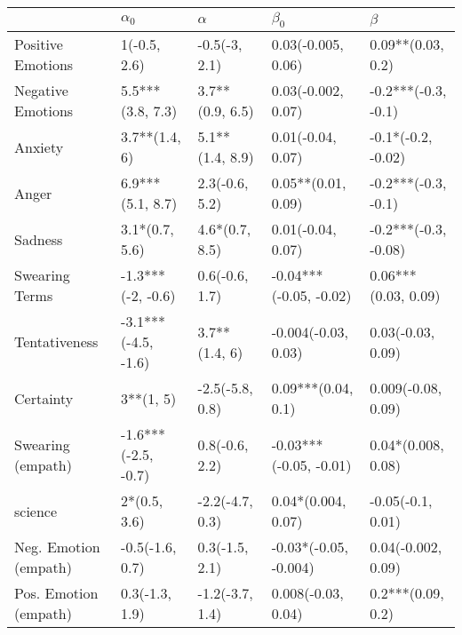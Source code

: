 \begin{tabular}{lllll}
\toprule
{} &           $\alpha_0$ &         $\alpha$ &               $\beta_0$ &               $\beta$ \\
\midrule
Positive Emotions     &         1(-0.5, 2.6) &    -0.5(-3, 2.1) &      0.03(-0.005, 0.06) &     0.09**(0.03, 0.2) \\
Negative Emotions     &     5.5***(3.8, 7.3) &  3.7**(0.9, 6.5) &      0.03(-0.002, 0.07) &   -0.2***(-0.3, -0.1) \\
Anxiety               &        3.7**(1.4, 6) &  5.1**(1.4, 8.9) &       0.01(-0.04, 0.07) &    -0.1*(-0.2, -0.02) \\
Anger                 &     6.9***(5.1, 8.7) &   2.3(-0.6, 5.2) &      0.05**(0.01, 0.09) &   -0.2***(-0.3, -0.1) \\
Sadness               &       3.1*(0.7, 5.6) &   4.6*(0.7, 8.5) &       0.01(-0.04, 0.07) &  -0.2***(-0.3, -0.08) \\
Swearing Terms        &    -1.3***(-2, -0.6) &   0.6(-0.6, 1.7) &  -0.04***(-0.05, -0.02) &   0.06***(0.03, 0.09) \\
Tentativeness         &  -3.1***(-4.5, -1.6) &    3.7**(1.4, 6) &     -0.004(-0.03, 0.03) &     0.03(-0.03, 0.09) \\
Certainty             &            3**(1, 5) &  -2.5(-5.8, 0.8) &      0.09***(0.04, 0.1) &    0.009(-0.08, 0.09) \\
Swearing (empath)     &  -1.6***(-2.5, -0.7) &   0.8(-0.6, 2.2) &  -0.03***(-0.05, -0.01) &    0.04*(0.008, 0.08) \\
science               &         2*(0.5, 3.6) &  -2.2(-4.7, 0.3) &      0.04*(0.004, 0.07) &     -0.05(-0.1, 0.01) \\
Neg. Emotion (empath) &      -0.5(-1.6, 0.7) &   0.3(-1.5, 2.1) &   -0.03*(-0.05, -0.004) &    0.04(-0.002, 0.09) \\
Pos. Emotion (empath) &       0.3(-1.3, 1.9) &  -1.2(-3.7, 1.4) &      0.008(-0.03, 0.04) &     0.2***(0.09, 0.2) \\
\bottomrule
\end{tabular}
